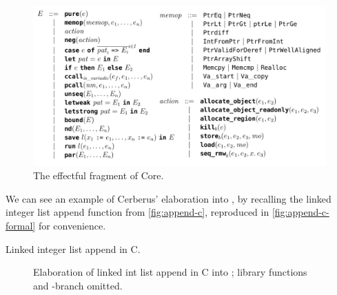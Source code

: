 \begin{figure}[tp]
    \ContinuedFloat{}
    \includegraphics{figures/effectful-core.png}
    \caption{The effectful fragment of Core.}\label{fig:effectful-core-grammar}
\end{figure}

We can see an example of Cerberus' elaboration into , by recalling the
linked integer list append function from \cref{fig:append-c}, reproduced
in \cref{fig:append-c-formal} for convenience.

\begin{marginfigure}
    \centering
    \caption{Linked integer list append in C.}\label{fig:append-c-formal}
\end{marginfigure}%

\begin{figure}[p]
    \centering
    \begin{minipage}{1.2\textwidth}
    \end{minipage}
    \caption{Elaboration of linked int list append in C into
         ; library functions and -branch
        omitted.}\label{fig:append-core}
\end{figure}%


